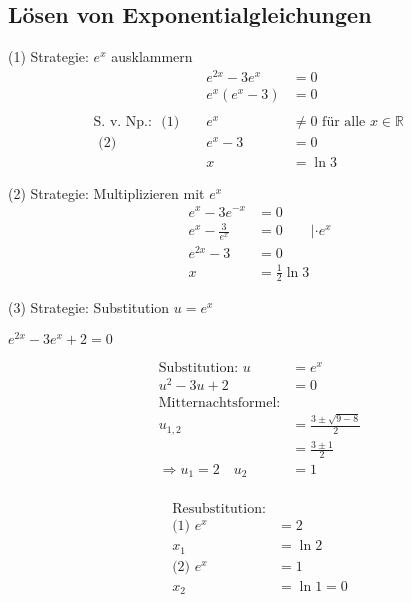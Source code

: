 \ \\
\ \\
\ \\

\subsection{Lösen von Exponentialgleichungen}

(1) Strategie: $e^x$ ausklammern
\begin{equation*}
    \begin{aligned}
        && e^{2x} - 3e^x & = 0 && \\
        && e^x(e^x -3) & = 0 && \\
        \ \\
        \text{S. v. Np.: } \text{ (1) } && e^x & \neq 0 \text{ für alle } x \in \mathbb{R} && \\
        \text{ (2) } && e^x - 3 & = 0 &&\\
        && x & = \ln{3} &&
    \end{aligned}
\end{equation*}

(2) Strategie: Multiplizieren mit $e^x$
\begin{equation*}
    \begin{aligned}
        e^x - 3e^{-x} & = 0 \\
        e^x - \frac{3}{e^x} & = 0 \qquad | \cdot e^x \\
        e^{2x} - 3 & = 0 \\
        x & = \frac{1}{2} \ln{3}
    \end{aligned}
\end{equation*}


(3) Strategie: Substitution $u = e^x$

{\centering $e^{2x} - 3e^x + 2 = 0$\par }

\begin{minipage}{0.5\textwidth}
    \begin{align*}
    \text{Substitution: } u & = e^x \\
    u^2 - 3u + 2 & = 0 \\
    \text{Mitternachtsformel:} & \\
    u_{1,2} & = \frac{3 \pm \sqrt{9 - 8}}{2} \\
     &= \frac{3 \pm 1}{2} \\
    \Rightarrow u_1 = 2 \quad u_2 & = 1 \\
\end{align*}
\end{minipage}
\begin{minipage}{0.5\textwidth}
    \begin{align*}
    \text{Resubstitution:} \\
    \text{(1) } e^x & = 2 \\
    x_1 & = \ln{2} \\
    \text{(2) } e^x & = 1 \\
    x_2 & = \ln{1} = 0
\end{align*}
\end{minipage}

